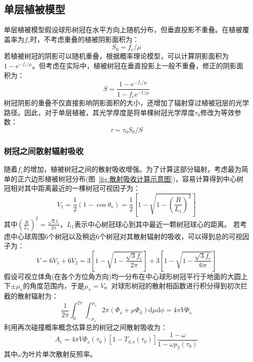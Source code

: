 \subsection{单层植被模型}
单层植被模型假设球形树冠在水平方向上随机分布，但垂直投影不重叠。在植被覆盖率为$f_{\mathrm {c}}$时，不考虑重叠的植被阴影面积为：
\begin{equation}
  S_{0}=f_{\mathrm{c}} / \mu
\end{equation}
若植被树冠的阴影可以随机重叠，根据概率理论模型，可以计算阴影面积为$1-{\mathrm e}^{-f_{\mathrm{c}}/\mu}$。但考虑在实际中，植被树冠在垂直投影上一般不重叠，修正的阴影面积为：
\begin{equation}\label{S_area}
  S=\frac{1-{\mathrm e}^{-f_{\mathrm{c}} / \mu}}{1-f_{\mathrm{c}} {\mathrm e}^{-1 / \mu}}
\end{equation}
树冠阴影的重叠不仅直接影响阴影面积的大小，还增加了辐射穿过植被冠层的光学路径。因此，对于单层植被，其光学厚度是将单棵树冠光学厚度$\tau_0$修改为等效参数：
\begin{equation}\label{tau}
  \tau=\tau_{0} S_{0} / S
\end{equation}

\subsubsection{树冠之间散射辐射吸收}
随着$f_{\mathrm {c}}$的增加，植被树冠之间的散射吸收增强。为了计算这部分辐射，考虑最为简单的正六边形植被树冠分布(图~\ref{fig:散射吸收计算示意图})，容易计算得到中心树冠相对其中距离最近的一棵树冠可视因子为：
\begin{equation}
  V_{1}=\frac{1}{2}\left(1-\cos \theta_{\mathrm{v}}\right)=\frac{1}{2}\left[1-\sqrt{1-\left(\frac{R}{L_{1}}\right)^{2}}\right]
\end{equation}
其中$\left(\frac{R}{L_{1}}\right)^{2}=\frac{\sqrt{3} f_{\mathrm{c}}}{2 \pi}$，$L_1$表示中心树冠球心到其中最近一颗树冠球心的距离。
若考虑中心球周围6个树冠以及稍远6个树冠对其散射辐射的吸收，可以得到总的可视因子为：
\begin{equation}
  V=6 V_{1}+6 V_{2}=3\left[1-\sqrt{1-\frac{\sqrt{3} f_{\mathrm{c}}}{2 \pi}}\right]+3\left[1-\sqrt{1-\frac{\sqrt{3} f_{\mathrm{c}}}{6 \pi}}\right]
\end{equation}
假设可视立体角(在各个方位角方向)均一分布在中心球形树冠平行于地面的大圆上下$\pm\mu_{\mathrm {v}}$的角度范围内，于是$\mu_{\mathrm {v}}=V$。对球形树冠的散射相函数进行积分得到初次拦截的散射辐射为：
\begin{equation}
  \frac{1}{2 \pi} \int_{0}^{2 \pi} \int_{-\mu_{\mathrm{{v}}}}^{\mu_{\mathrm{v}}} 2 \pi\left(\Phi_{\mathrm{a}}+\mu \Phi_{\mathrm{d}}\right) {\mathrm d} \mu {\mathrm d} \phi=4 \pi V \Phi_{\mathrm{a}}
\end{equation}
利用再次碰撞概率概念估算总的树冠之间散射吸收为：
\begin{equation}
  A_{\mathrm{c}}=4 \pi V \Phi_{\mathrm{a}}\left(\tau_{0}\right)\left[1-T_{\mathrm{d, s}}\left(\tau_{0}\right)\right] \frac{1-\omega}{1-\omega p_{2}\left(\tau_{0}\right)}
\end{equation}
其中$\omega$为叶片单次散射反照率。

